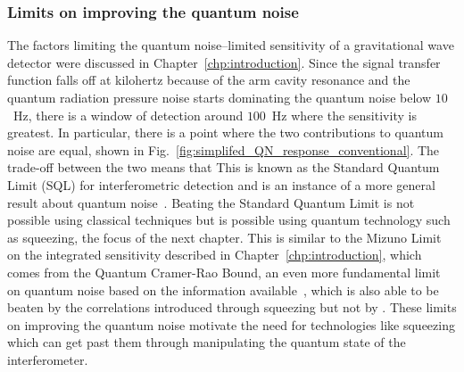 
\subsubsection{Limits on improving the quantum noise}

The factors limiting the quantum noise--limited sensitivity of a gravitational wave detector were discussed in Chapter~\ref{chp:introduction}. Since the signal transfer function falls off at kilohertz because of the arm cavity resonance and the quantum radiation pressure noise starts dominating the quantum noise below $10$~Hz, there is a window of detection around $100$~Hz where the sensitivity is greatest. In particular, there is a point where the two contributions to quantum noise are equal, shown in Fig.~\ref{fig:simplifed_QN_response_conventional}. The trade-off between the two  means that 
This is known as the Standard Quantum Limit (SQL) for interferometric detection and is an instance of a more general result about quantum noise~\cite{}. Beating the Standard Quantum Limit is not possible using classical techniques but is possible using quantum technology such as squeezing, the focus of the next chapter. This is similar to the Mizuno Limit on the integrated sensitivity described in Chapter~\ref{chp:introduction}, which comes from the Quantum Cramer-Rao Bound, an even more fundamental limit on quantum noise based on the information available~\cite{}, which is also able to be beaten by the correlations introduced through squeezing but not by .
These limits on improving the quantum noise motivate the need for technologies like squeezing which can get past them through manipulating the quantum state of the interferometer. 



